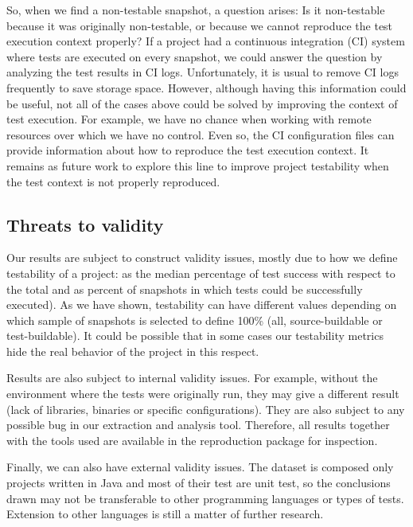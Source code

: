 So, when we find a non-testable snapshot, a question arises: Is it non-testable because it was originally non-testable, or because we cannot reproduce the test execution context properly?
If a project had a continuous integration (CI) system where tests are executed on every snapshot, we could answer the question by analyzing the test results in CI logs. Unfortunately, it is usual to remove CI logs frequently to save storage space. 
However, although having this information could be useful, not all of the cases above could be solved by improving the context of test execution. 
For example, we have no chance when working with remote resources over which we have no control.
Even so, the CI configuration files can provide information about how to reproduce the test execution context.
It remains as future work to explore this line to improve project testability when the test context is not properly reproduced. 


\subsection{Threats to validity}

Our results are subject to construct validity issues, mostly due to how we define testability of a project: as the median percentage of test success with respect to the total and as percent of snapshots in which tests could be successfully executed). 
As we have shown, testability can have different values depending on which sample of snapshots is selected to define 100\% (all, source-buildable or test-buildable). 
It could be possible that in some cases our testability metrics hide the real behavior of the project in this respect.

Results are also subject to internal validity issues. 
For example, without the environment where the tests were originally run, they may give a different result (lack of libraries, binaries or specific configurations). 
They are also subject to any possible bug in our extraction and analysis tool. 
Therefore, all results together with the tools used are available in the reproduction package for inspection.

Finally, we can also have external validity issues. 
The dataset is composed only projects written in Java and most of their test are unit test, so the conclusions drawn may not be transferable to other programming languages or types of tests. 
Extension to other languages is still a matter of further research.
